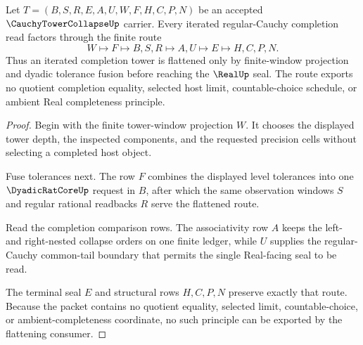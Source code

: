 \begin{theorem}
\label{thm:cauchy-tower-collapse-finite-window-flattening}
Let $T=(B,S,R,E,A,U,W,F,H,C,P,N)$ be an accepted $\CauchyTowerCollapseUp$ carrier. Every iterated regular-Cauchy completion read factors through the finite route
$$
W \longmapsto F \longmapsto B,S,R \longmapsto A,U \longmapsto E \longmapsto H,C,P,N .
$$
Thus an iterated completion tower is flattened only by finite-window projection and dyadic tolerance fusion before reaching the $\RealUp$ seal. The route exports no quotient completion equality, selected host limit, countable-choice schedule, or ambient Real completeness principle.
\end{theorem}
\begin{proof}
Begin with the finite tower-window projection $W$. It chooses the displayed tower depth, the inspected components, and the requested precision cells without selecting a completed host object.

Fuse tolerances next. The row $F$ combines the displayed level tolerances into one $\DyadicRatCoreUp$ request in $B$, after which the same observation windows $S$ and regular rational readbacks $R$ serve the flattened route.

Read the completion comparison rows. The associativity row $A$ keeps the left- and right-nested collapse orders on one finite ledger, while $U$ supplies the regular-Cauchy common-tail boundary that permits the single Real-facing seal to be read.

The terminal seal $E$ and structural rows $H,C,P,N$ preserve exactly that route. Because the packet contains no quotient equality, selected limit, countable-choice, or ambient-completeness coordinate, no such principle can be exported by the flattening consumer.
\end{proof}



